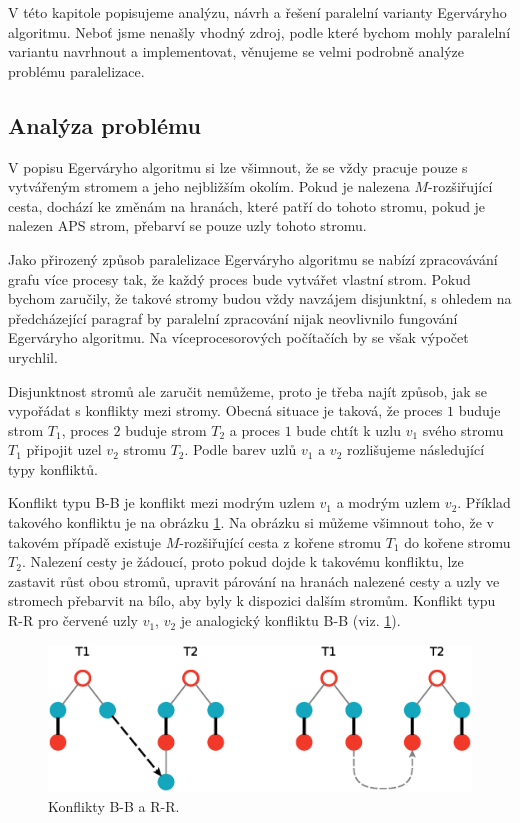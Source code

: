 \documentclass[a4paper, 11pt, titlepage, final]{article}[3. prosinec 2011]
\begin{document}
V této kapitole popisujeme analýzu, návrh a řešení paralelní varianty Egerváryho algoritmu. Neboť jsme nenašly vhodný zdroj, podle které bychom mohly paralelní variantu navrhnout a implementovat, věnujeme se velmi podrobně analýze problému paralelizace. 

\subsection{Analýza problému}

V popisu Egerváryho algoritmu si lze všimnout, že se vždy pracuje pouze s vytvářeným stromem a jeho nejbližším okolím. Pokud je nalezena $M$-rozšiřující cesta, dochází ke změnám na hranách, které patří do tohoto stromu, pokud je nalezen APS strom, přebarví se pouze uzly tohoto stromu.

Jako přirozený způsob paralelizace Egerváryho algoritmu se nabízí zpracovávání grafu více procesy tak, že každý proces bude vytvářet vlastní strom. Pokud bychom zaručily, že takové stromy budou vždy navzájem disjunktní, s ohledem na předcházející paragraf by paralelní zpracování nijak neovlivnilo fungování Egerváryho algoritmu. Na víceprocesorových počítačích by se však výpočet urychlil.

Disjunktnost stromů ale zaručit nemůžeme, proto je třeba najít způsob, jak se vypořádat s konflikty mezi stromy. Obecná situace je taková, že proces $1$ buduje strom $T_1$, proces $2$ buduje strom $T_2$ a proces $1$ bude chtít k uzlu $v_1$ svého stromu $T_1$ připojit uzel $v_2$ stromu $T_2$. Podle barev uzlů $v_1$ a $v_2$ rozlišujeme následující typy konfliktů.

Konflikt typu B-B je konflikt mezi modrým uzlem $v_1$ a modrým uzlem $v_2$. Příklad takového konfliktu je na obrázku \ref{imgXX}. Na obrázku si můžeme všimnout toho, že v takovém případě existuje $M$-rozšiřující cesta z kořene stromu $T_1$ do kořene stromu $T_2$. Nalezení cesty je žádoucí, proto pokud dojde k takovému konfliktu, lze zastavit růst obou stromů, upravit párování na hranách nalezené cesty a uzly ve stromech přebarvit na bílo, aby byly k dispozici dalším stromům. Konflikt typu R-R pro červené uzly $v_1$, $v_2$ je analogický konfliktu B-B (viz. \ref{imgXX}).

\begin{figure}[ht]
  \centering
  \includegraphics[scale=0.5]{img/XXconflicts.eps}
  \caption{Konflikty B-B a R-R.}
  \label{imgXX}
\end{figure}
\end{document}
